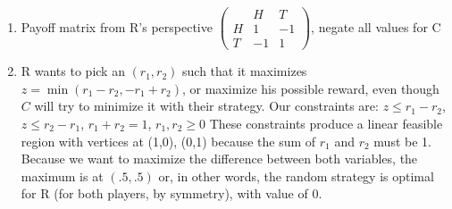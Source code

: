 \documentclass[11pt]{article}
\begin{document}
\begin{enumerate}
\begin{enumerate}
\item
Payoff matrix from R's perspective
$\begin{pmatrix} &H&T\\H&1&-1\\T&-1&1\end{pmatrix}$, negate all values for C
\item R wants to pick an $(r_1,r_2)$ such that it maximizes $z=\min(r_1-r_2,-r_1+r_2)$, or maximize his possible reward, even though $C$ will try to minimize it with their strategy. Our constraints are: $z \le r_1-r_2$, $z\le r_2-r_1$, $r_1+r_2=1$, $r_1,r_2\ge 0$ These constraints produce a linear feasible region with vertices at (1,0), (0,1) because the sum of $r_1$ and $r_2$ must be 1. Because we want to maximize the difference between both variables, the maximum is at $(.5,.5)$ or, in other words, the random strategy is optimal for R (for both players, by symmetry), with value of $0$.


\end{enumerate}
\end{enumerate}
\end{document}

